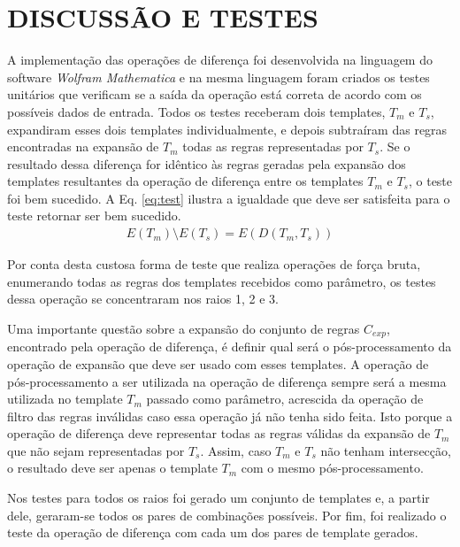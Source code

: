 \section{DISCUSSÃO E TESTES}
\label{sec:discussoesETestes}
A implementação das operações de diferença foi desenvolvida na linguagem do software \textit{Wolfram Mathematica} \cite{woframMathematica10} e na mesma linguagem foram criados os testes unitários que verificam se a saída da operação está correta de acordo com os possíveis dados de entrada. Todos os testes receberam dois templates, $T_m$ e $T_s$, expandiram esses dois templates individualmente, e depois subtraíram das regras encontradas na expansão de $T_m$ todas as regras representadas por $T_s$. Se o resultado dessa diferença for idêntico às regras geradas pela expansão dos templates resultantes da operação de diferença entre os templates $T_m$ e $T_s$, o teste foi bem sucedido. A Eq. \ref{eq:test} ilustra a igualdade que deve ser satisfeita para o teste retornar ser bem sucedido.
\begin{equation}
\begin{split}
E(T_m) \setminus E(T_s) = E(D(T_m,T_s))
\label{eq:test}
\end{split}
\end{equation}
\label{eq:operationsTemplateParidade}

Por conta desta custosa forma de teste que realiza operações de força bruta, enumerando todas as regras dos templates recebidos como parâmetro, os testes dessa operação se concentraram nos raios 1, 2 e 3.

Uma importante questão sobre a expansão do conjunto de regras $C_{exp}$, encontrado pela operação de diferença, é definir qual será o pós-processamento da operação de expansão que deve ser usado com esses templates. A operação de pós-processamento a ser utilizada na operação de diferença sempre será a mesma utilizada no template $T_m$ passado como parâmetro, acrescida da operação de filtro das regras inválidas caso essa operação já não tenha sido feita. Isto porque a operação de diferença deve representar todas as regras válidas da expansão de $T_m$ que não sejam representadas por $T_s$. Assim, caso $T_m$ e $T_s$ não tenham intersecção, o resultado deve ser apenas o template $T_m$ com o mesmo pós-processamento.

Nos testes para todos os raios foi gerado um conjunto de templates e, a partir dele, geraram-se todos os pares de combinações possíveis. Por fim, foi realizado o teste da operação de diferença com cada um dos pares de template gerados.

